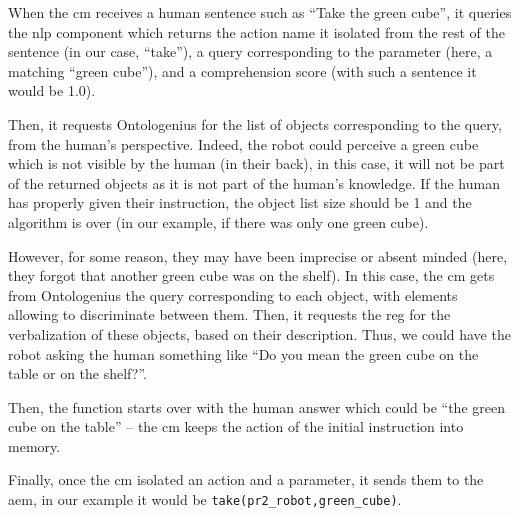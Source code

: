 \documentclass[a4paper,11pt,twoside]{StyleThese}
\begin{document}
When the \acrshort{cm} receives a human sentence such as ``Take the green cube'', it queries the \acrfull{nlp} component which returns the action name it isolated from the rest of the sentence (\eg in our case, ``take''), a \sparql{} query corresponding to the parameter (\eg here, a \sparql{} matching ``green cube''), and a comprehension score (\eg with such a sentence it would be 1.0). 

Then, it requests Ontologenius for the list of objects corresponding to the \sparql{} query, from the human's perspective. Indeed, the robot could perceive a green cube which is not visible by the human (\eg in their back), in this case, it will not be part of the returned objects as it is not part of the human's knowledge. If the human has properly given their instruction, the object list size should be 1 and the algorithm is over (\eg in our example, if there was only one green cube). 

However, for some reason, they may have been imprecise or absent minded (\eg here, they forgot that another green cube was on the shelf). In this case, the \acrshort{cm} gets from Ontologenius the \sparql{} query corresponding to each object, with elements allowing to discriminate between them. Then, it requests the \acrshort{reg} for the verbalization of these objects, based on their \sparql{} description. Thus, we could have the robot asking the human something like ``Do you mean the green cube on the table or on the shelf?''. 

Then, the function starts over with the human answer which could be ``the green cube on the table'' -- the \acrshort{cm} keeps the action of the initial instruction into memory.

Finally, once the \acrshort{cm} isolated an action and a parameter, it sends them to the \acrlong{aem}, in our example it would be \verb'take(pr2_robot,green_cube)'.



\ifdefined{}
\else


\end{document}
